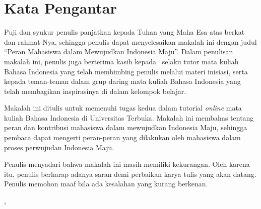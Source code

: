 \chapter*{Kata Pengantar}


Puji dan syukur penulis panjatkan kepada Tuhan yang Maha Esa atas berkat dan rahmat-Nya, sehingga penulis dapat menyelesaikan makalah ini dengan judul “Peran Mahasiswa dalam Mewujudkan Indonesia Maju”. Dalam penulisan makalah ini, penulis juga berterima kasih kepada \namaTutorPengampu\ selaku tutor mata kuliah Bahasa Indonesia yang telah membimbing penulis melalui materi inisiasi, serta kepada teman-teman dalam grup daring mata kuliah Bahasa Indonesia yang telah membagikan inspirasinya di dalam kelompok belajar.

Makalah ini ditulis untuk memenuhi tugas kedua dalam tutorial \textit{online} mata kuliah Bahasa Indonesia di Universitas Terbuka. Makalah ini membahas tentang peran dan kontribusi mahasiswa dalam mewujudkan Indonesia Maju, sehingga pembaca dapat mengerti peran-peran yang dilakukan oleh mahasiswa dalam proses perwujudan Indonesia Maju.

Penulis menyadari bahwa makalah ini masih memiliki kekurangan. Oleh karena itu, penulis berharap adanya saran demi perbaikan karya tulis yang akan datang. Penulis memohon maaf bila ada kesalahan yang kurang berkenan.

\vfill
\hfill \daearhMahasiswa, \tanggalLengkap


\hfill \namaMahasiswa
\vfill